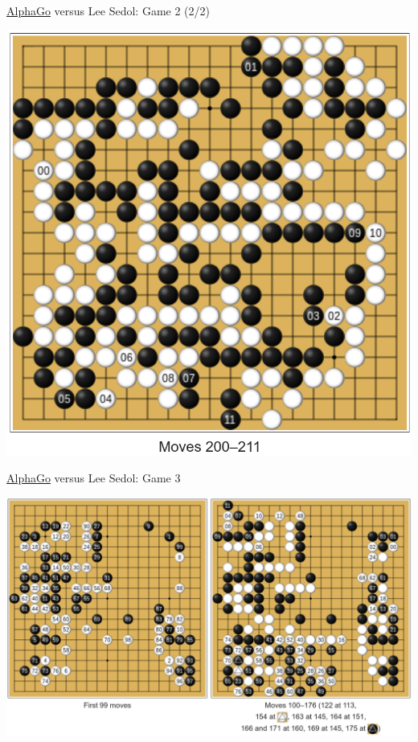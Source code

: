 \documentclass{beamer}
\begin{document}
{    \begin{frame}{{\color{black}\underline{AlphaGo}} versus {\color{white}Lee Sedol}: Game 2 (2/2)}
      \begin{center}
        \includegraphics[height=.85\textheight]{../img/AlphaGo_vs_Lee_Sedol_Game_2b.png}
      \end{center}
    \end{frame}

    \begin{frame}{{\color{white}\underline{AlphaGo}} versus {\color{black}Lee Sedol}: Game 3}
      \begin{center}
        \includegraphics[width=\textwidth]{../img/AlphaGo_vs_Lee_Sedol_Game_3.png}
      \end{center}
    \end{frame}

}
\end{document}
